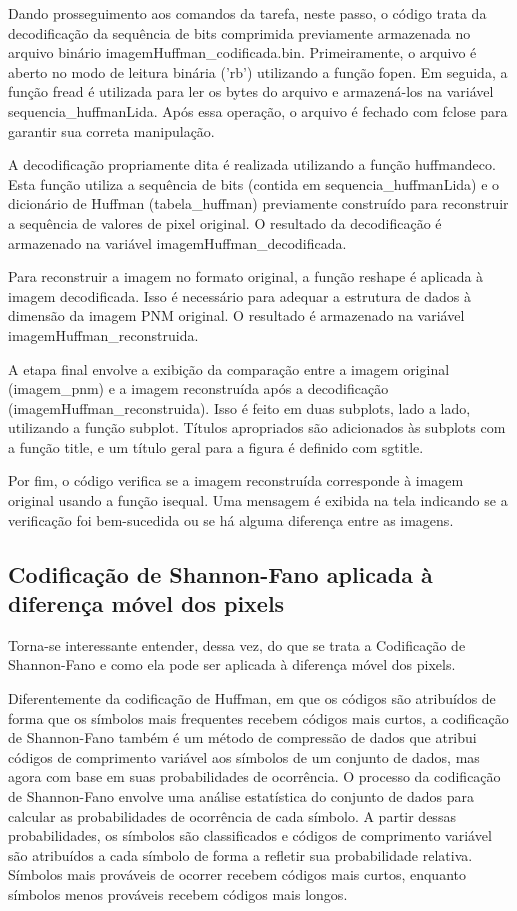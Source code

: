 \documentclass{article}
\begin{document}
Dando prosseguimento aos comandos da tarefa, neste passo, o código trata da decodificação da sequência de bits comprimida previamente armazenada no arquivo binário imagemHuffman\_codificada.bin. Primeiramente, o arquivo é aberto no modo de leitura binária ('rb') utilizando a função fopen. Em seguida, a função fread é utilizada para ler os bytes do arquivo e armazená-los na variável sequencia\_huffmanLida. Após essa operação, o arquivo é fechado com fclose para garantir sua correta manipulação.

A decodificação propriamente dita é realizada utilizando a função huffmandeco. Esta função utiliza a sequência de bits (contida em sequencia\_huffmanLida) e o dicionário de Huffman (tabela\_huffman) previamente construído para reconstruir a sequência de valores de pixel original. O resultado da decodificação é armazenado na variável imagemHuffman_decodificada.

Para reconstruir a imagem no formato original, a função reshape é aplicada à imagem decodificada. Isso é necessário para adequar a estrutura de dados à dimensão da imagem PNM original. O resultado é armazenado na variável imagemHuffman\_reconstruida.

A etapa final envolve a exibição da comparação entre a imagem original (imagem\_pnm) e a imagem reconstruída após a decodificação (imagemHuffman\_reconstruida). Isso é feito em duas subplots, lado a lado, utilizando a função subplot. Títulos apropriados são adicionados às subplots com a função title, e um título geral para a figura é definido com sgtitle.

Por fim, o código verifica se a imagem reconstruída corresponde à imagem original usando a função isequal. Uma mensagem é exibida na tela indicando se a verificação foi bem-sucedida ou se há alguma diferença entre as imagens.

\subsection{Codificação de Shannon-Fano aplicada à diferença móvel dos pixels}

Torna-se interessante entender, dessa vez, do que se trata a Codificação de Shannon-Fano e como ela pode ser aplicada à diferença móvel dos pixels.

Diferentemente da codificação de Huffman, em que os códigos são atribuídos de forma que os símbolos mais frequentes recebem códigos mais curtos, a codificação de Shannon-Fano também é um método de compressão de dados que atribui códigos de comprimento variável aos símbolos de um conjunto de dados, mas agora com base em suas probabilidades de ocorrência. O processo da codificação de Shannon-Fano envolve uma análise estatística do conjunto de dados para calcular as probabilidades de ocorrência de cada símbolo. A partir dessas probabilidades, os símbolos são classificados e códigos de comprimento variável são atribuídos a cada símbolo de forma a refletir sua probabilidade relativa. Símbolos mais prováveis de ocorrer recebem códigos mais curtos, enquanto símbolos menos prováveis recebem códigos mais longos. 
\end{document}
